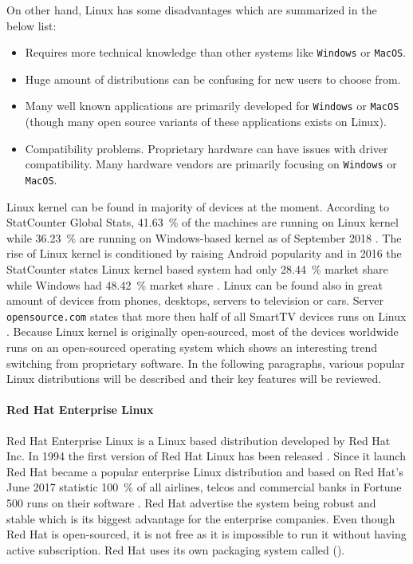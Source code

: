 On other hand, Linux has some disadvantages which are summarized in the below list:
\begin{itemize}
	\item Requires more technical knowledge than other systems like \texttt{Windows} or \texttt{MacOS}.
	\item Huge amount of distributions can be confusing for new users to choose from. 
	\item Many well known applications are primarily developed for \texttt{Windows} or \texttt{MacOS} (though many open source variants of these applications exists on Linux).
	\item Compatibility problems. Proprietary hardware can have issues with driver compatibility. Many hardware vendors are primarily focusing on \texttt{Windows} or \texttt{MacOS}.
\end{itemize}
Linux kernel can be found in majority of devices at the moment. According to StatCounter Global Stats, \SI{41.63}{\percent} of the machines are running on Linux kernel while \SI{36.23}{\percent} are running on Windows-based kernel as of September 2018 \cite{StatCounter}. The rise of Linux kernel is conditioned by raising Android popularity and in 2016 the StatCounter states Linux kernel based system had only \SI{28.44}{\percent} market share while Windows had \SI{48.42}{\percent} market share \cite{StatCounter}. Linux can be found also in great amount of devices from phones, desktops, servers to television or cars. Server \texttt{opensource.com} states that more then half of all SmartTV devices runs on Linux \cite{opensourcecom}. Because Linux kernel is originally open-sourced, most of the devices worldwide runs on an open-sourced operating system which shows an interesting trend switching from proprietary software. In the following paragraphs, various popular Linux distributions will be described and their key features will be reviewed. 
\paragraph{Red Hat Enterprise Linux}
Red Hat Enterprise Linux is a Linux based distribution developed by Red Hat Inc. In 1994 the first version of Red Hat Linux has been released \cite{rhhistory}. Since it launch Red Hat became a popular enterprise Linux distribution and based on Red Hat's June 2017 statistic \SI{100}{\percent} of all airlines, telcos and commercial banks in Fortune 500 runs on their software \cite{rhtrusted}. Red Hat advertise the system being robust and stable which is its biggest advantage for the enterprise companies. Even though Red Hat is open-sourced, it is not free as it is impossible to run it without having active subscription. Red Hat uses its own packaging system called  ().
